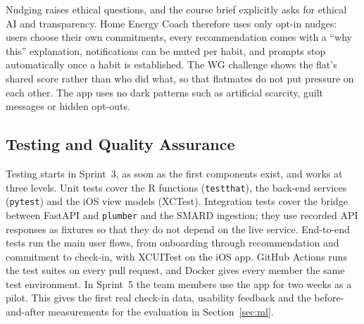 \documentclass[conference]{IEEEtran}
\newcommand{\pkg}[1]{\texttt{#1}}
\begin{document}
Nudging raises ethical questions, and the course brief explicitly asks for ethical AI and transparency. Home Energy Coach therefore uses only opt-in nudges: users choose their own commitments, every recommendation comes with a ``why this'' explanation, notifications can be muted per habit, and prompts stop automatically once a habit is established. The WG challenge shows the flat's shared score rather than who did what, so that flatmates do not put pressure on each other. The app uses no dark patterns such as artificial scarcity, guilt messages or hidden opt-outs.

\subsection{Testing and Quality Assurance}
Testing starts in Sprint~3, as soon as the first components exist, and works at three levels. Unit tests cover the R functions (\pkg{testthat}), the back-end services (\pkg{pytest}) and the iOS view models (XCTest). Integration tests cover the bridge between FastAPI and \pkg{plumber} and the SMARD ingestion; they use recorded API responses as fixtures so that they do not depend on the live service. End-to-end tests run the main user flows, from onboarding through recommendation and commitment to check-in, with XCUITest on the iOS app. GitHub Actions runs the test suites on every pull request, and Docker gives every member the same test environment. In Sprint~5 the team members use the app for two weeks as a pilot. This gives the first real check-in data, usability feedback and the before-and-after measurements for the evaluation in Section~\ref{sec:ml}.
\end{document}
